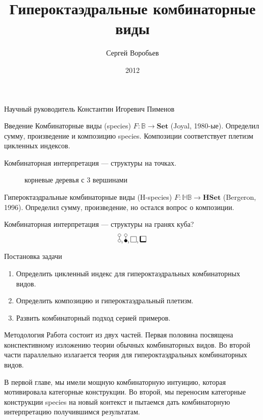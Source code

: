 \documentclass{beamer}
\title{Гипероктаэдральные комбинаторные виды}
\author{Сергей Воробьев}
\institute{Санкт-Петербургский Государственный университет}
\date{2012}
\begin{document}
\begin{frame}
\titlepage
\begin{center}
\begin{small}
Научный руководитель Константин Игоревич Пименов
\end{small}
\end{center}
\end{frame}


\begin{frame}{Введение}
Комбинаторные виды (species) $F\colon \mathbb{B} \rightarrow
\mathbf{Set}$ (Joyal, 1980-ые). Определил сумму, произведение и композицию
species. Композиции соответствует плетизм цикленных
индексов.

Комбинаторная интерпретация --- структуры на точках.
\begin{figure}
\begin{center}
\dTrees
\caption{корневые деревья с 3 вершинами}
\end{center}
\end{figure}

Гипероктаэдральные комбинаторные виды
(H-species) $F\colon \mathbb{HB} \rightarrow \mathbf{HSet}$ (Bergeron, 1996).
Определил сумму, произведение, но остался вопрос о композиции.

Комбинаторная интерпретация --- структуры на гранях куба?
$$
\dA, \dB, \dAA, \dBB
$$
\end{frame}

\begin{frame}{Постановка задачи}
\begin{enumerate}[*]
\item Определить цикленный индекс для гипероктаэдральных комбинаторных видов.
\item Определить композицию и гипероктаэдральный плетизм.
\item Развить комбинаторный подход серией примеров.
\end{enumerate}
\end{frame}

\begin{frame}{Методология}
Работа состоит из двух частей. Первая половина посвящена конспективному
изложению теории обычных комбинаторных видов. Во второй части параллельно излагается теория для гипероктаэдральных
комбинаторных видов.

В первой главе, мы имели мощную комбинаторную интуицию, которая
мотивировала категорные конструкции. Во второй, мы переносим категорные
конструкции species на новый контекст и пытаемся дать комбинаторную
интерпретацию получившимся результатам.
\end{frame}
\end{document}

